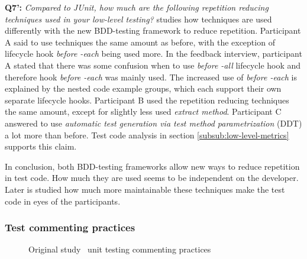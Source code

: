 \textbf{Q7':} \textit{Compared to JUnit, how much are the following repetition reducing techniques used in your low-level testing?}
studies how techniques are used differently with the new BDD-testing framework to reduce repetition. Participant A
said to use techniques the same amount as before, with the exception of lifecycle hook \textit{before -each} being used more.
In the feedback interview, participant A stated that there was some confusion when to use \textit{before -all}
lifecycle hook and therefore hook \textit{before -each} was mainly used. The increased use of \textit{before -each} is
explained by the nested code example groups, which each support their own separate lifecycle hooks. Participant B used
the repetition reducing techniques the same amount, except for slightly less used \textit{extract method}. Participant
C answered to use \textit{automatic test generation via test method parametrization} (DDT) a lot more than before. Test
code analysis in section \ref{subsub:low-level-metrics} supports this claim.

In conclusion, both BDD-testing frameworks allow new ways to reduce repetition in test code. How much they are used
seems to be independent on the developer. Later is studied how much more maintainable these techniques
make the test code in eyes of the participants.

\subsubsection{Test commenting practices}
    \begin{figure}[ht]%
        \centering
        \qquad
        \caption{Original study~\cite{li2016automatically} unit testing commenting practices}%
        \label{fig:org-commenting}%
    \end{figure}

